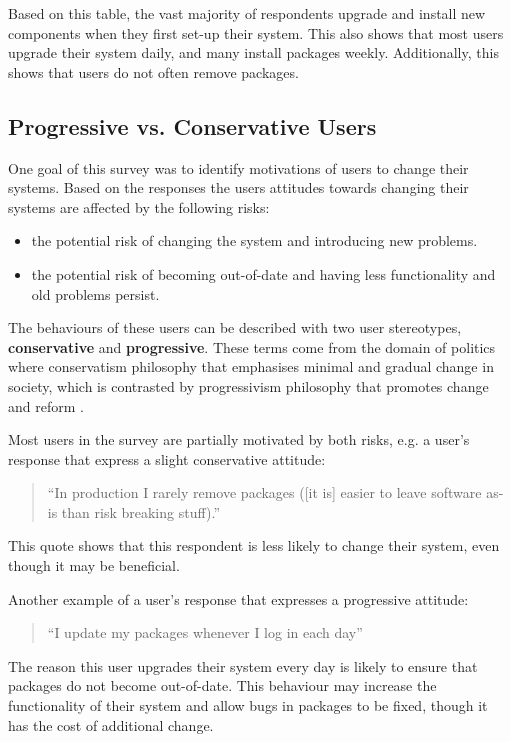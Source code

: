 Based on this table, the vast majority of respondents upgrade and install new components when they first set-up their system.
This also shows that most users upgrade their system daily, and many install packages weekly.
Additionally, this shows that users do not often remove packages. 

\subsection{Progressive vs. Conservative Users}
One goal of this survey was to identify motivations of users to change their systems.
Based on the responses the users attitudes towards changing their systems are affected by the following risks:
\begin{itemize}
  \item the potential risk of changing the system and introducing new problems.
  \item the potential risk of becoming out-of-date and having less functionality and old problems persist.
\end{itemize}
The behaviours of these users can be described with two user stereotypes, \textbf{conservative} and \textbf{progressive}.
These terms come from the domain of politics where conservatism philosophy that emphasises minimal and gradual change in society,
which is contrasted by progressivism philosophy that promotes change and reform \citep{oed2010}.

Most users in the survey are partially motivated by both risks, e.g. a user's response that express a slight conservative attitude:
\begin{quotation}
``In production I rarely remove packages ([it is] easier to leave software as-is than risk breaking stuff).''
\end{quotation}
This quote shows that this respondent is less likely to change their system, even though it may be beneficial. 

Another example of a user's response that expresses a progressive attitude:
\begin{quotation}
``I update my packages whenever I log in each day''
\end{quotation}
The reason this user upgrades their system every day is likely to ensure that packages do not become out-of-date.
This behaviour may increase the functionality of their system and allow bugs in packages to be fixed, though it has the cost of additional change.

